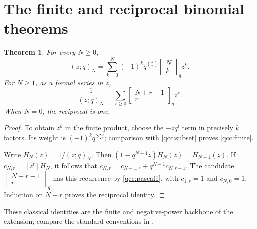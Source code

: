 \documentclass[11pt,a4paper,oneside,openany]{book}
\newtheorem{theorem}{Theorem}[chapter]
\theoremstyle{definition}
\theoremstyle{remark}
\newcommand{\GB}[3][q]{\begin{bmatrix}#2\\#3\end{bmatrix}_{#1}}
\begin{document}
\section{The finite and reciprocal binomial theorems}
\begin{theorem}\label{qcc:finite-binomial}
For every \(N\ge0\),
\begin{equation}\label{qcc:finite}
 (z;q)_N=\sum_{k=0}^N(-1)^kq^{\binom{k}{2}}\GB Nk z^k.
\end{equation}
For \(N\ge1\), as a formal series in \(z\),
\begin{equation}\label{qcc:reciprocal}
 \frac1{(z;q)_N}=\sum_{r\ge0}\GB{N+r-1}r z^r.
\end{equation}
When \(N=0\), the reciprocal is one.
\end{theorem}
\begin{proof}
To obtain \(z^k\) in the finite product, choose the \(-zq^i\) term in precisely
\(k\) factors. Its weight is \((-1)^kq^{\sum i}\); comparison with
\eqref{qcc:subset} proves \eqref{qcc:finite}.

Write \(H_N(z)=1/(z;q)_N\). Then
\((1-q^{N-1}z)H_N(z)=H_{N-1}(z)\).
If \(c_{N,r}=[z^r]H_N\), it follows that
\(c_{N,r}=c_{N-1,r}+q^{N-1}c_{N,r-1}\).
The candidate \(\GB{N+r-1}r\) has this recurrence by
\eqref{qcc:pascal1}, with \(c_{1,r}=1\) and \(c_{N,0}=1\).
Induction on \(N+r\) proves the reciprocal identity.
\end{proof}

These classical identities are the finite and negative-power backbone of the
extension; compare the standard conventions in \cite{dlmf172,dlmf175}.
\end{document}
